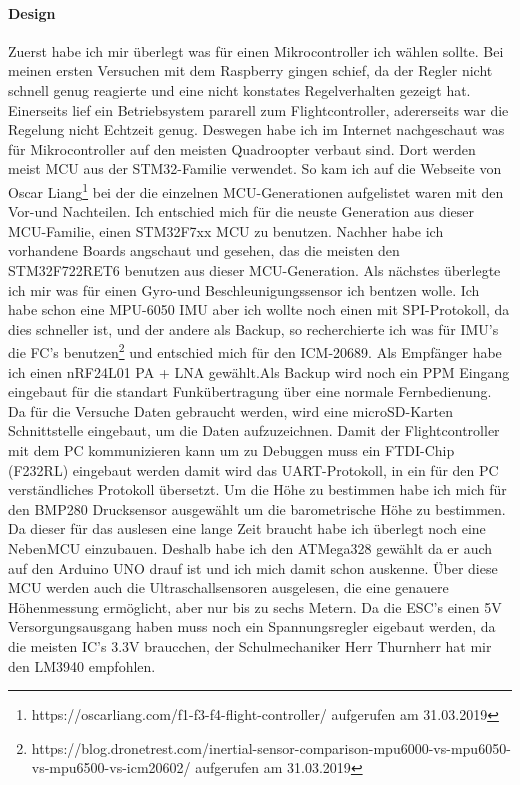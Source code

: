 \documentclass[12pt,a4paper, ngerman]{article}
\begin{document}
\paragraph{Design}
\iffalse
Zuerst habe ich mir überlegt was für einen Mikrocontroller ich wählen sollte. Bei meinen ersten Versuchen mit dem Raspberry gingen schief, da der Regler nicht schnell genug reagierte und eine nicht konstates Regelverhalten gezeigt hat. Einerseits lief ein Betriebsystem pararell zum Flightcontroller, adererseits war die Regelung nicht Echtzeit genug. Deswegen habe ich im Internet nachgeschaut was für Mikrocontroller auf den meisten Quadroopter verbaut sind. Dort werden  meist MCU aus der STM32-Familie verwendet. So kam ich auf die Webseite von Oscar Liang\footnote{\label{foot:1}https://oscarliang.com/f1-f3-f4-flight-controller/ aufgerufen am 31.03.2019} bei der die einzelnen MCU-Generationen aufgelistet waren mit den Vor-und Nachteilen. Ich entschied mich für die neuste Generation aus dieser MCU-Familie, einen STM32F7xx MCU zu benutzen. Nachher habe ich vorhandene Boards angschaut und gesehen, das die meisten den STM32F722RET6 benutzen aus dieser MCU-Generation. Als nächstes überlegte ich mir was für einen Gyro-und Beschleunigungssensor ich bentzen wolle. Ich habe schon eine MPU-6050 IMU aber ich wollte noch einen mit SPI-Protokoll, da dies schneller ist, und der andere als Backup, so recherchierte ich was für IMU's die FC's benutzen\footnote{\label{foot:2}https://blog.dronetrest.com/inertial-sensor-comparison-mpu6000-vs-mpu6050-vs-mpu6500-vs-icm20602/ aufgerufen am 31.03.2019} und entschied mich für den ICM-20689. Als Empfänger habe ich einen nRF24L01 PA + LNA gewählt.Als Backup wird noch ein PPM Eingang eingebaut für die standart Funkübertragung über eine normale Fernbedienung. Da für die Versuche Daten gebraucht werden, wird eine microSD-Karten Schnittstelle eingebaut, um die Daten aufzuzeichnen. Damit der Flightcontroller mit dem PC kommunizieren kann um zu Debuggen muss ein FTDI-Chip (F232RL) eingebaut werden damit wird das UART-Protokoll, in ein für den PC verständliches Protokoll übersetzt. Um die Höhe zu bestimmen habe ich mich für den BMP280 Drucksensor ausgewählt um die barometrische Höhe zu bestimmen. Da dieser für das auslesen eine lange Zeit braucht habe ich überlegt noch eine NebenMCU einzubauen. Deshalb habe ich den ATMega328 gewählt da er auch auf den Arduino UNO drauf ist und ich mich damit schon auskenne. Über diese MCU werden auch die Ultraschallsensoren ausgelesen, die eine genauere Höhenmessung ermöglicht, aber nur bis zu sechs Metern. Da die ESC's einen 5V Versorgungsausgang haben muss noch ein Spannungsregler  eigebaut werden, da die meisten IC's 3.3V braucchen, der Schulmechaniker Herr Thurnherr hat mir den LM3940 empfohlen.
\end{document}
